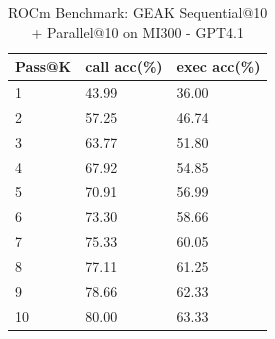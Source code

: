 \begin{table}
 \caption{ROCm Benchmark: GEAK Sequential@10 + Parallel@10 on MI300 - GPT4.1}
  \centering
  \begin{tabular}{lll}
    \toprule
    Pass@K & call acc(\%) & exec acc(\%) \\
       \midrule
   1 & 43.99 & 36.00 \\
   2 & 57.25 & 46.74 \\
   3 & 63.77 & 51.80 \\
   4 & 67.92 & 54.85 \\
   5 & 70.91 & 56.99 \\
   6 & 73.30 & 58.66 \\
   7 & 75.33 & 60.05 \\
   8 & 77.11 & 61.25 \\
   9 & 78.66 & 62.33 \\
   10 & 80.00 & 63.33 \\
   
    \bottomrule
  \end{tabular}
  \label{tab:parallel_scaling_rocm_mi300}
\end{table}